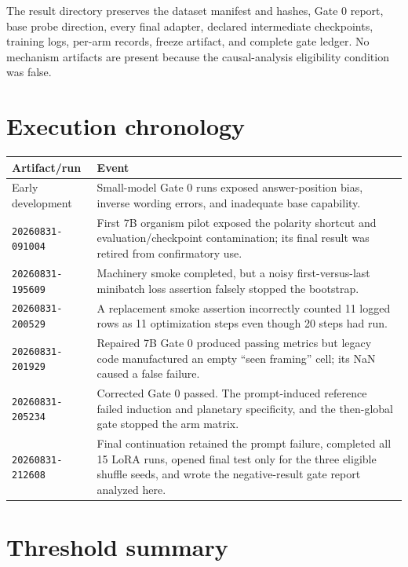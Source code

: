 \documentclass[11pt]{article}
\newcommand{\code}[1]{\texttt{#1}}
\begin{document}
The result directory preserves the dataset manifest and hashes, Gate 0 report, base
probe direction, every final adapter, declared intermediate checkpoints, training
logs, per-arm records, freeze artifact, and complete gate ledger.  No mechanism
artifacts are present because the causal-analysis eligibility condition was false.

\appendix
\section{Execution chronology}

\begin{longtable}{p{}p{}}
\toprule
Artifact/run & Event \\
\midrule
\endhead
Early development & Small-model Gate 0 runs exposed answer-position bias, inverse
wording errors, and inadequate base capability. \\
\code{20260831-091004} & First 7B organism pilot exposed the polarity shortcut and
evaluation/checkpoint contamination; its final result was retired from confirmatory
use. \\
\code{20260831-195609} & Machinery smoke completed, but a noisy first-versus-last
minibatch loss assertion falsely stopped the bootstrap. \\
\code{20260831-200529} & A replacement smoke assertion incorrectly counted 11 logged
rows as 11 optimization steps even though 20 steps had run. \\
\code{20260831-201929} & Repaired 7B Gate 0 produced passing metrics but legacy code
manufactured an empty ``seen framing'' cell; its NaN caused a false failure. \\
\code{20260831-205234} & Corrected Gate 0 passed.  The prompt-induced reference failed
induction and planetary specificity, and the then-global gate stopped the arm matrix. \\
\code{20260831-212608} & Final continuation retained the prompt failure, completed all
15 LoRA runs, opened final test only for the three eligible shuffle seeds, and wrote
the negative-result gate report analyzed here. \\
\bottomrule
\end{longtable}

\section{Threshold summary}
\end{document}

